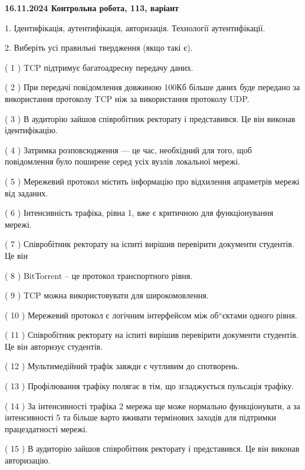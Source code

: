 \documentclass[12pt, ukrainian]{article}
\begin{document}
\vspace{4mm}
\newpage
\begin {large}

\textbf{16.11.2024 Контрольна робота, 113, варіант  }\par


{
1. Ідентифікація, аутентифікація, авторизація. Технології аутентифікації.



\vspace{5mm}
2. Виберіть усі правильні твердження (якщо такі є).\par
\vspace{2mm}

( 1 ) TCP підтримує багатоадресну передачу даних.

( 2 ) При передачі повідомлення довжиною 100Кб більше даних буде передано за використання протоколу TCP ніж за використання протоколу UDP.

( 3 ) В аудиторію зайшов співробітник ректорату і представився. Це він виконав ідентифікацію.

( 4 ) Затримка розповсюдження — це час, необхідний для того, щоб повідомлення було поширене серед усіх вузлів локальної мережі.

( 5 ) Мережевий протокол містить інформацію про відхилення апраметрів мережі від заданих.

( 6 ) Інтенсивність трафіка, рівна 1, вже є критичною для функціонування мережі.

( 7 ) Співробітник ректорату на іспиті вирішив перевірити документи студентів. Це він

( 8 ) BitTorrent – це протокол транспортного рівня.

( 9 ) TCP можна використовувати для широкомовлення.

( 10 ) Мережевий протокол є логічним інтерфейсом між об“єктами одного рівня.

( 11 ) Співробітник ректорату на іспиті вирішив перевірити документи студентів. Це він авторизує студентів.

( 12 ) Мультимедійний трафік завжди є чутливим до спотворень.

( 13 ) Профілювання трафіку полягає в тім, що згладжується пульсація трафіку.

( 14 ) За інтенсивності трафіка 2 мережа ще може нормально функціонувати, а за інтенсивності 5 та більше варто вживати термінових заходів для підтримки працездатності мережі.

( 15 ) В аудиторію зайшов співробітник ректорату і представився. Це він виконав авторизацію.
}
\end {large}
\end{document}
